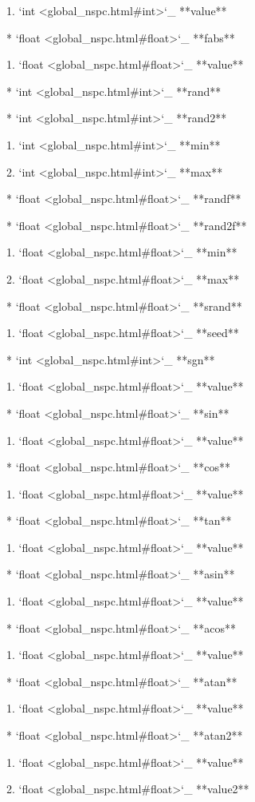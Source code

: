 		1. `int <global_nspc.html#int>`_ **value**

	* `float <global_nspc.html#float>`_ **fabs**

		1. `float <global_nspc.html#float>`_ **value**

	* `int <global_nspc.html#int>`_ **rand**

	* `int <global_nspc.html#int>`_ **rand2**

		1. `int <global_nspc.html#int>`_ **min**

		2. `int <global_nspc.html#int>`_ **max**

	* `float <global_nspc.html#float>`_ **randf**

	* `float <global_nspc.html#float>`_ **rand2f**

		1. `float <global_nspc.html#float>`_ **min**

		2. `float <global_nspc.html#float>`_ **max**

	* `float <global_nspc.html#float>`_ **srand**

		1. `float <global_nspc.html#float>`_ **seed**

	* `int <global_nspc.html#int>`_ **sgn**

		1. `float <global_nspc.html#float>`_ **value**

	* `float <global_nspc.html#float>`_ **sin**

		1. `float <global_nspc.html#float>`_ **value**

	* `float <global_nspc.html#float>`_ **cos**

		1. `float <global_nspc.html#float>`_ **value**

	* `float <global_nspc.html#float>`_ **tan**

		1. `float <global_nspc.html#float>`_ **value**

	* `float <global_nspc.html#float>`_ **asin**

		1. `float <global_nspc.html#float>`_ **value**

	* `float <global_nspc.html#float>`_ **acos**

		1. `float <global_nspc.html#float>`_ **value**

	* `float <global_nspc.html#float>`_ **atan**

		1. `float <global_nspc.html#float>`_ **value**

	* `float <global_nspc.html#float>`_ **atan2**

		1. `float <global_nspc.html#float>`_ **value**

		2. `float <global_nspc.html#float>`_ **value2**

